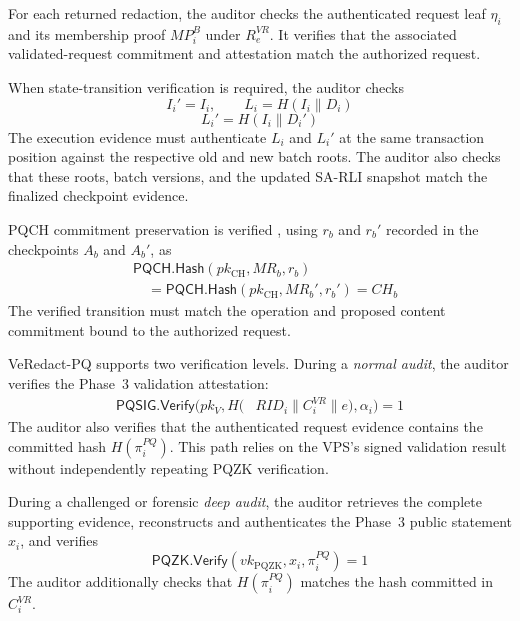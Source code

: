 \documentclass[lettersize,journal]{IEEEtran}
\begin{document}
    For each returned redaction, the auditor
    checks the authenticated request leaf
    $\eta_i$ and its membership proof
    $MP_i^B$ under $R_e^{VR}$. It verifies
    that the associated validated-request
    commitment and attestation match the
    authorized request.
    
    When state-transition verification is
    required, the auditor checks
    \begin{equation}
    I_i'=I_i,\qquad
    L_i=H(I_i\parallel D_i)
    \end{equation}
    \begin{equation}
    L_i'=H(I_i\parallel D_i')
    \end{equation}
    The execution evidence must authenticate
    $L_i$ and $L_i'$ at the same transaction
    position against the respective old
    and new batch roots. The auditor also
    checks that these roots, batch versions,
    and the updated SA-RLI snapshot match
    the finalized checkpoint evidence.
    
    PQCH commitment preservation is verified {, using $r_b$
    and $r_b'$ recorded in the checkpoints $A_b$ and $A_b'$,}
    as
    \begin{equation}
    \begin{aligned}
    &\mathsf{PQCH.Hash}
    (pk_{\mathrm{CH}},MR_b,r_b)\\
    &\quad=
    \mathsf{PQCH.Hash}
    (pk_{\mathrm{CH}},MR_b',r_b')
    =CH_b
    \end{aligned}
    \end{equation}
    The verified transition must match the
    operation and proposed content commitment
    bound to the authorized request.
    
    VeRedact-PQ supports two verification
    levels. During a \emph{normal audit},
    the auditor verifies the Phase~3
    validation attestation:
    \begin{equation}
    \begin{aligned}
    \mathsf{PQSIG.Verify}\big(
    pk_V,
    H(&RID_i\parallel C_i^{VR}\parallel e),
    \alpha_i\big)=1
    \end{aligned}
    \end{equation}
    The auditor also verifies that the
    authenticated request evidence contains
    the committed hash $H(\pi_i^{PQ})$.
    This path relies on the VPS's signed
    validation result without independently
    repeating PQZK verification.
    
    During a challenged or forensic
    \emph{deep audit}, the auditor retrieves
    the complete supporting evidence,
    reconstructs and authenticates the
    Phase~3 public statement $x_i$, and
    verifies
    \begin{equation}
    \mathsf{PQZK.Verify}
    (vk_{\mathrm{PQZK}},x_i,
    \pi_i^{PQ})=1
    \end{equation}
    The auditor additionally checks that
    $H(\pi_i^{PQ})$ matches the hash
    committed in $C_i^{VR}$.
    
\end{document}
